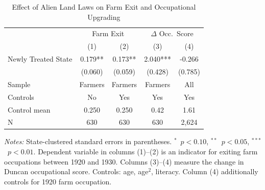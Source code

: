 \begin{table}[htbp]
\centering
\caption{Effect of Alien Land Laws on Farm Exit and Occupational Upgrading}
\label{tab:main}
\begin{tabular}{lcccc}
\hline\hline
 & \multicolumn{2}{c}{Farm Exit} & \multicolumn{2}{c}{$\Delta$ Occ.\ Score} \\
 & (1) & (2) & (3) & (4) \\
\hline
Newly Treated State & 0.179** & 0.173** & 2.040*** & -0.266 \\
 & (0.060) & (0.059) & (0.428) & (0.785) \\
\addlinespace
Sample & Farmers & Farmers & Farmers & All \\
Controls & No & Yes & Yes & Yes \\
Control mean & 0.250 & 0.250 & 0.42 & 1.61 \\
N & 630 & 630 & 630 & 2,624 \\
\hline\hline
\end{tabular}
\begin{tablenotes}
\item \textit{Notes:} State-clustered standard errors in parentheses. $^{*}$~$p<0.10$, $^{**}$~$p<0.05$, $^{***}$~$p<0.01$. Dependent variable in columns (1)--(2) is an indicator for exiting farm occupations between 1920 and 1930. Columns (3)--(4) measure the change in Duncan occupational score. Controls: age, age$^2$, literacy. Column (4) additionally controls for 1920 farm occupation.
\end{tablenotes}
\end{table}
